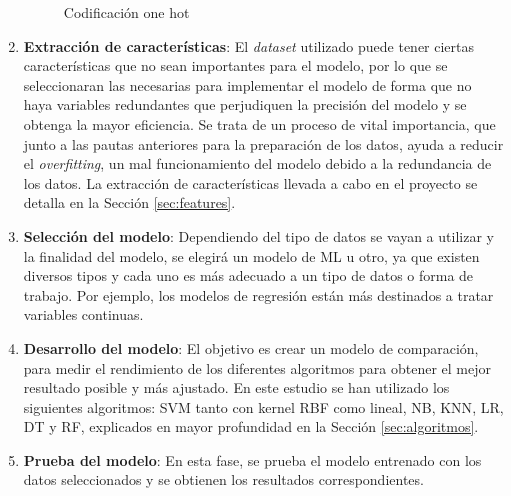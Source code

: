 \begin{enumerate}
    \begin{figure}[h!]
    \begin{center}
    {}
    \end{center}
    \caption{Codificación one hot}
    \label{fig:onehot}
    \end{figure}
    
    \item \textbf{Extracción de características}: El \textit{dataset} utilizado puede tener ciertas características que no sean importantes para el modelo, por lo que se seleccionaran las necesarias para implementar el modelo de forma que no haya variables redundantes que perjudiquen la precisión del modelo y se obtenga la mayor eficiencia. Se trata de un proceso de vital importancia, que junto a las pautas anteriores para la preparación de los datos, ayuda a reducir el \textit{overfitting}, un mal funcionamiento del modelo debido a la redundancia de los datos. La extracción de características llevada a cabo en el proyecto se detalla en la Sección \ref{sec:features}.
    
    \item \textbf{Selección del modelo}: Dependiendo del tipo de datos se vayan a utilizar y la finalidad del modelo, se elegirá un modelo de \gls{ML} u otro, ya que existen diversos tipos y cada uno es más adecuado a un tipo de datos o forma de trabajo. Por ejemplo, los modelos de regresión están más destinados a tratar variables continuas.
    
    \item \textbf{Desarrollo del modelo}: El objetivo es crear un modelo de comparación, para medir el rendimiento de los diferentes algoritmos para obtener el mejor resultado posible y más ajustado. En este estudio se han utilizado los siguientes algoritmos: \gls{SVM} tanto con kernel \gls{RBF} como lineal, \gls{NB}, \gls{KNN}, \gls{LR}, \gls{DT} y \gls{RF}, explicados en mayor profundidad en la Sección \ref{sec:algoritmos}.
    
    \item \textbf{Prueba del modelo}: En esta fase, se prueba el modelo entrenado con los datos seleccionados y se obtienen los resultados correspondientes.
    
\end{enumerate}



